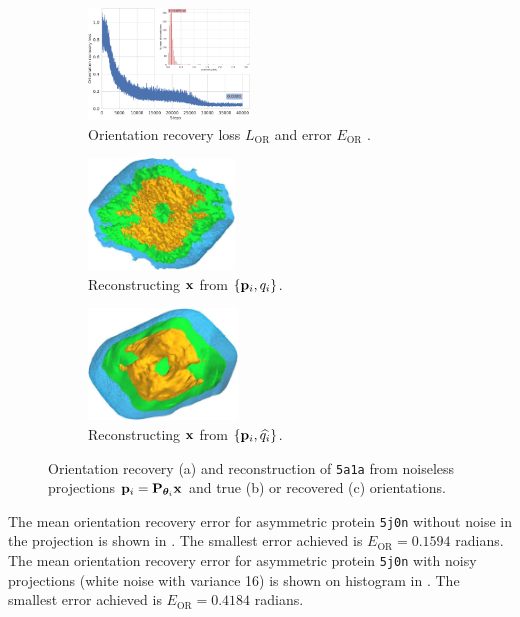 \begin{figure}[t]
    \centering
    \begin{subfigure}[b]{0.42\textwidth}
        \centering
        \includegraphics[width=\linewidth,height=8em]{figures/5a1a_noise0_ar_aa}
        \caption{%
            Orientation recovery loss $L_\text{OR}$  and error $E_\text{OR}$ .
        }\label{fig:5a1a-noise0-orientation-recovery}
    \end{subfigure}
    \hfill
    \begin{subfigure}[b]{0.27\linewidth}
        \centering
        \includegraphics[height=8em]{figures/5a1a_ground_truth}
        \caption{Reconstructing $\mathbf{x}$ from $\{ \mathbf{p}_i, q_i \}$.}
    \end{subfigure}
    \hfill
    \begin{subfigure}[b]{0.27\linewidth}
        \centering
        \includegraphics[height=8em]{figures/5a1a_aligned}
        \caption{Reconstructing $\mathbf{x}$ from $\{ \mathbf{p}_i, \widehat{q_i} \}$.}
    \end{subfigure}
    \caption{%
        Orientation recovery (a) and reconstruction of \texttt{5a1a} from noiseless projections $\mathbf{p}_i = \mathbf{P}_{{\boldsymbol{\theta}}_i} \mathbf{x}$ and true (b) or recovered (c) orientations.
    }\label{fig:5a1a-noise0-reconstruction}
\end{figure}

The mean orientation recovery error for asymmetric protein \texttt{5j0n} without noise in the projection is shown in .
The smallest error achieved is $E_\text{OR} = 0.1594$ radians.
The mean orientation recovery error for asymmetric protein \texttt{5j0n} with noisy projections (white noise with variance 16) is shown on histogram in .
The smallest error achieved is $E_\text{OR} = 0.4184$ radians.

